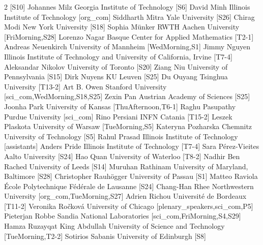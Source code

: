 \begin{multicols}{2}
  [S10]
\participantne
  {Johannes Milz}
  {Georgia Institute of Technology}
  [S6]
\participantne
  {David Minh}
  {Illinois Institute of Technology}
  [org_com]
\participantne
  {Siddharth Mitra}
  {Yale University}
  [S26]
\participantne
  {Chirag Modi}
  {New York University}
  [S18]
\participantne
  {Sophia M\"unker}
  {RWTH Aachen University}
  [FriMorning,S28]
\participantne
  {Lorenzo Nagar}
  {Basque Center for Applied Mathematics}
  [T2-1]
\participantne
  {Andreas Neuenkirch}
  {University of Mannheim}
  [WedMorning,S1]
\participantne
  {Jimmy Nguyen}
  {Illinois Institute of Technology and University of California, Irvine}
  [T7-4]
\participantne
  {Aleksandar Nikolov}
  {University of Toronto}
  [S20]
\participantne
  {Ziang Niu}
  {University of Pennsylvania}
  [S15]
\participantne
  {Dirk Nuyens}
  {KU Leuven}
  [S25]
\participantne
  {Du Ouyang}
  {Tsinghua University}
  [T13-2]
\participantne
  {Art B. Owen}
  {Stanford University}
  [sci_com,WedMorning,S18,S25]
\participantne
  {Zexin Pan}
  {Austrian Academy of Sciences}
  [S25]
\participantne
  {Joonha Park}
  {University of Kansas}
  [ThuAfternoon,T6-1]
\participantne
  {Raghu Pasupathy}
  {Purdue University}
  [sci_com]
\participantne
  {Rino Persiani}
  {INFN Catania}
  [T15-2]
\participantne
  {Leszek Plaskota}
  {University of Warsaw}
  [TueMorning,S5]
\participantne
  {Kateryna Pozharska}
  {Chemnitz University of Technology}
  [S5]
\participantne
  {Rahul Prasad}
  {Illinois Institute of Technology}
  [assistants]
\participantne
  {Anders Pride}
  {Illinois Institute of Technology}
  [T7-4]
\participantne
  {Sara P\'erez-Vieites}
  {Aalto University}
  [S24]
\participantne
  {Hao Quan}
  {University of Waterloo}
  [T8-2]
\participantne
  {Nadhir Ben Rached}
  {University of Leeds}
  [S14]
\participantne
  {Muruhan Rathinam}
  {University of Maryland, Baltimore}
  [S28]
\participantne
  {Christopher Rauh\"ogger}
  {University of Passau}
  [S1]
\participantne
  {Matteo Raviola}
  {\'Ecole Polytechnique F\'ed\'erale de Lausanne}
  [S24]
\participantne
  {Chang-Han Rhee}
  {Northwestern University}
  [org_com,TueMorning,S27]
\participantne
  {Adrien Richou}
  {Universit\'e de Bordeaux}
  [T11-2]
\participantne
  {Veronika Ro\v{c}kov\'a}
  {University of Chicago}
  [plenary_speakers,sci_com,P5]
\participantne
  {Pieterjan Robbe}
  {Sandia National Laboratories}
  [sci_com,FriMorning,S4,S29]
\participantne
  {Hamza Ruzayqat}
  {King Abdullah University of Science and Technology}
  [TueMorning,T2-2]
\participantne
  {Sotirios Sabanis}
  {University of Edinburgh}
  [S8]
\participantne

\end{multicols}
